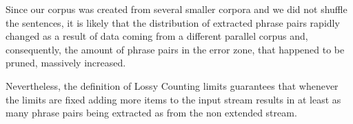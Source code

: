 Since our corpus was created from several smaller corpora and we did not shuffle the sentences,
it is likely that the distribution of extracted phrase pairs rapidly changed as a result of data
coming from a different parallel corpus and, consequently, the amount of phrase pairs in the error zone,
that happened to be pruned, massively increased.

Nevertheless, the definition of Lossy Counting limits guarantees that
whenever the limits are fixed adding more items to the input stream results in at least
as many phrase pairs being extracted as from the non extended stream.
